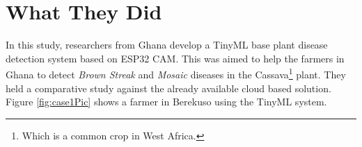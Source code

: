 \documentclass[../../main]{subfiles}
\begin{document}
\section{What They Did} \label{sec:}

In this study\cite{ieee01africa}, researchers from Ghana develop a TinyML base plant
disease detection system based on ESP32 CAM. This was aimed to help the farmers
in Ghana to detect \emph{Brown Streak} and \emph{Mosaic} diseases in the
Cassava\footnote{Which is a common crop in West Africa.} plant. They held a comparative
study against the already available cloud based solution. Figure \ref{fig:case1Pic}
shows a farmer in Berekuso using the TinyML system.
\end{document}
